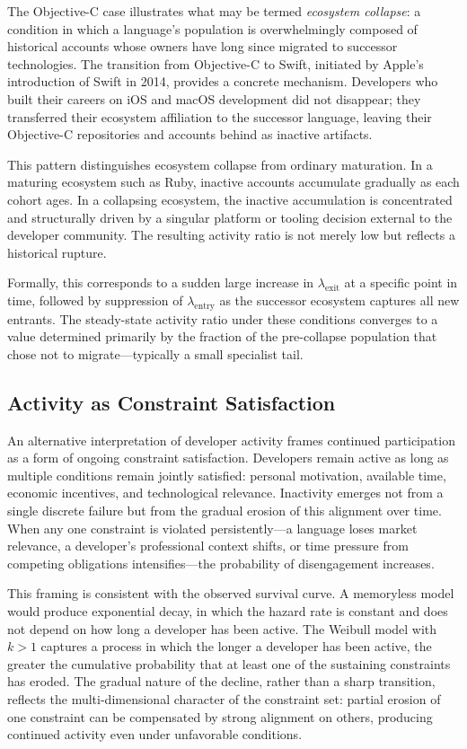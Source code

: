 \documentclass[12pt,a4paper]{article}
\begin{document}
The Objective-C case illustrates what may be termed \emph{ecosystem collapse}: a condition in which a language's population is overwhelmingly composed of historical accounts whose owners have long since migrated to successor technologies. The transition from Objective-C to Swift, initiated by Apple's introduction of Swift in 2014, provides a concrete mechanism. Developers who built their careers on iOS and macOS development did not disappear; they transferred their ecosystem affiliation to the successor language, leaving their Objective-C repositories and accounts behind as inactive artifacts.

This pattern distinguishes ecosystem collapse from ordinary maturation. In a maturing ecosystem such as Ruby, inactive accounts accumulate gradually as each cohort ages. In a collapsing ecosystem, the inactive accumulation is concentrated and structurally driven by a singular platform or tooling decision external to the developer community. The resulting activity ratio is not merely low but reflects a historical rupture.

Formally, this corresponds to a sudden large increase in $\lambda_{\text{exit}}$ at a specific point in time, followed by suppression of $\lambda_{\text{entry}}$ as the successor ecosystem captures all new entrants. The steady-state activity ratio under these conditions converges to a value determined primarily by the fraction of the pre-collapse population that chose not to migrate---typically a small specialist tail.

\subsection{Activity as Constraint Satisfaction}

An alternative interpretation of developer activity frames continued participation as a form of ongoing constraint satisfaction. Developers remain active as long as multiple conditions remain jointly satisfied: personal motivation, available time, economic incentives, and technological relevance. Inactivity emerges not from a single discrete failure but from the gradual erosion of this alignment over time. When any one constraint is violated persistently---a language loses market relevance, a developer's professional context shifts, or time pressure from competing obligations intensifies---the probability of disengagement increases.

This framing is consistent with the observed survival curve. A memoryless model would produce exponential decay, in which the hazard rate is constant and does not depend on how long a developer has been active. The Weibull model with $k > 1$ captures a process in which the longer a developer has been active, the greater the cumulative probability that at least one of the sustaining constraints has eroded. The gradual nature of the decline, rather than a sharp transition, reflects the multi-dimensional character of the constraint set: partial erosion of one constraint can be compensated by strong alignment on others, producing continued activity even under unfavorable conditions.
\end{document}
